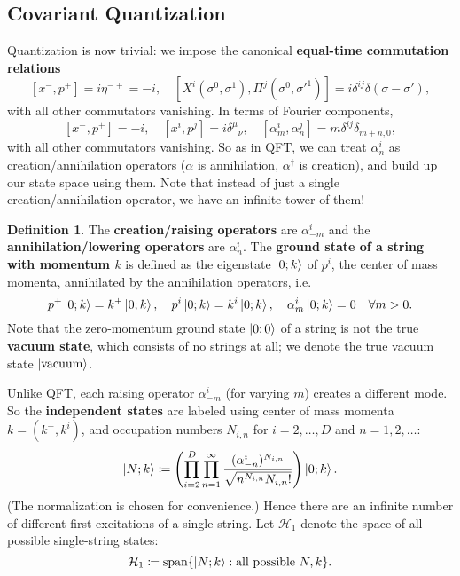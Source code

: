 \documentclass{report}
\theoremstyle{plain}
\theoremstyle{definition}
\newtheorem{definition}[theorem]{Definition}
\theoremstyle{remark}
\newcommand{\cH}{\mathcal{H}}
\DeclareMathOperator{\vspan}{span}
\newcommand{\vacuum}{\text{vacuum}}
\begin{document}
\subsection{Covariant Quantization}

Quantization is now trivial: we impose the canonical {\bf equal-time
  commutation relations}
\[ [x^-, p^+] = i\eta^{-+} = -i, \quad [X^i(\sigma^0, \sigma^1), \Pi^j(\sigma^0, \sigma'^1)] = i\delta^{ij} \delta(\sigma - \sigma'), \]
with all other commutators vanishing. In terms of Fourier components,
\[ [x^-, p^+] = -i, \quad [x^i, p^j] = i\delta^\mu{}_\nu, \quad [\alpha^i_m, \alpha^j_n] = m \delta^{ij} \delta_{m+n,0}, \]
with all other commutators vanishing. So as in QFT, we can treat
$\alpha^i_n$ as creation/annihilation operators ($\alpha$ is annihilation, $\alpha^\dag$ is creation), and build up our
state space using them. Note that instead of just a single
creation/annihilation operator, we have an infinite tower of them!

\begin{definition}
  The {\bf creation/raising operators} are $\alpha^i_{-m}$ and the
  {\bf annihilation/lowering operators} are $\alpha^i_n$. The {\bf
    ground state of a string with momentum $k$} is defined as the
  eigenstate $\ket{0; k}$ of $p^i$, the center of mass momenta,
  annihilated by the annihilation operators, i.e.
  \[ p^+\ket{0; k} = k^+\ket{0; k}, \quad p^i\ket{0; k} = k^i\ket{0; k}, \quad \alpha^i_m\ket{0; k} = 0 \quad \forall m > 0. \]
  Note that the zero-momentum ground state $\ket{0; 0}$ of a string is
  not the true {\bf vacuum state}, which consists of no strings at
  all; we denote the true vacuum state $\ket{\vacuum}$.
\end{definition}

Unlike QFT, each raising operator $\alpha^i_{-m}$ (for varying $m$)
creates a different mode. So the {\bf independent states} are labeled
using center of mass momenta $k = (k^+, k^i)$, and occupation numbers
$N_{i,n}$ for $i = 2, \ldots, D$ and $n = 1, 2, \ldots$:
\[ \ket{N; k} \coloneqq \left(\prod_{i=2}^D \prod_{n=1}^\infty \frac{(\alpha^i_{-n})^{N_{i,n}}}{\sqrt{n^{N_{i,n}} N_{i,n}!}}\right) \ket{0; k}. \]
(The normalization is chosen for convenience.) Hence there are an
infinite number of different first excitations of a single string. Let
$\cH_1$ denote the space of all possible single-string states:
\[ \cH_1 \coloneqq \vspan\{\ket{N; k} : \text{all possible } N, k\}. \]
\end{document}

